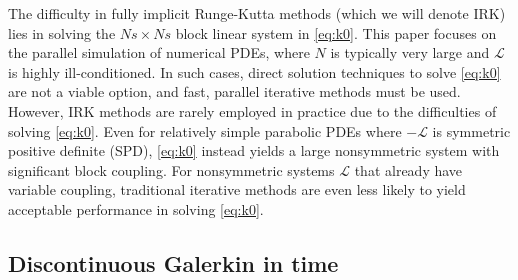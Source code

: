 \documentclass[review]{siamart}
\begin{document}
The difficulty in fully implicit Runge-Kutta methods (which we will denote IRK) lies in
solving the $Ns\times Ns$ block linear system in \eqref{eq:k0}. This paper focuses on the
parallel simulation of numerical PDEs, where $N$ is typically very large
and $\mathcal{L}$ is highly ill-conditioned. In such cases, direct
solution techniques to solve \eqref{eq:k0} are not a viable option, and fast, parallel
iterative methods must be used. However, IRK methods are rarely employed in practice due
to the difficulties of solving \eqref{eq:k0}. Even for relatively simple
parabolic PDEs where $-\mathcal{L}$ is symmetric positive definite (SPD), \eqref{eq:k0}
instead yields a large nonsymmetric system with significant block coupling. For
nonsymmetric systems $\mathcal{L}$ that already have variable coupling, traditional
iterative methods are even less likely to yield acceptable performance in solving
\eqref{eq:k0}.

\subsection{Discontinuous Galerkin in time}\label{sec:intro:dg}
\end{document}
